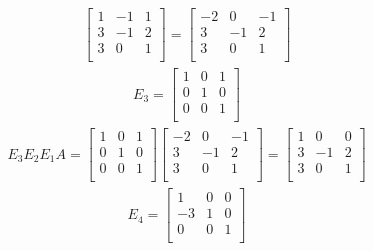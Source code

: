 \documentclass[12pt]{article}
\begin{document}
\begin{enumerate}
\begin{align*}
      \begin{bmatrix}
        1 & -1 & 1\\
        3 & -1 & 2\\
        3 &  0 & 1\\
      \end{bmatrix}
      =
      \begin{bmatrix}
        -2 &  0 & -1\\
         3 & -1 & 2\\
         3 &  0 & 1\\
      \end{bmatrix}
    \end{align*}
    \begin{align*}
      E_3 =
      \begin{bmatrix}
        1 &  0 & 1\\
        0 &  1 & 0\\
        0 &  0 & 1\\
      \end{bmatrix}
    \end{align*}
    \begin{align*}
      E_3E_2E_1A =
      \begin{bmatrix}
        1 &  0 & 1\\
        0 &  1 & 0\\
        0 &  0 & 1\\
      \end{bmatrix}
      \begin{bmatrix}
        -2 &  0 & -1\\
         3 & -1 & 2\\
         3 &  0 & 1\\
      \end{bmatrix}
      =
      \begin{bmatrix}
        1 &  0 & 0\\
        3 & -1 & 2\\
        3 &  0 & 1\\
      \end{bmatrix}
    \end{align*}
    \begin{align*}
      E_4 =
      \begin{bmatrix}
         1 &  0 & 0\\
        -3 &  1 & 0\\
         0 &  0 & 1\\
      \end{bmatrix}
    \end{align*}

\end{enumerate}
\end{document}
